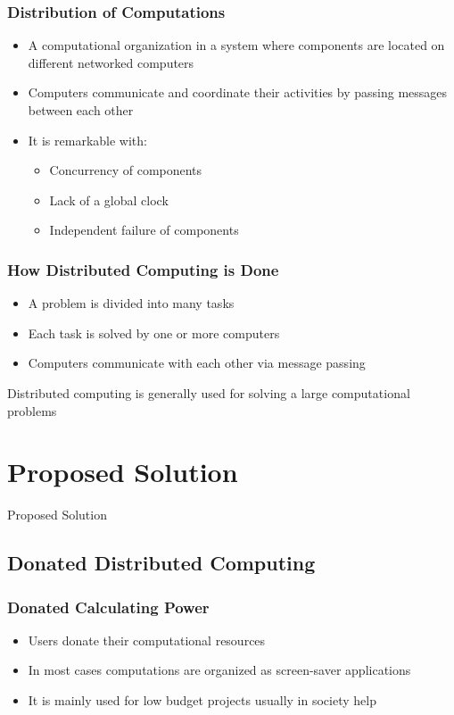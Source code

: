 \documentclass{beamer}
\begin{document}
\begin{frame}
\frametitle{Distribution of Computations}
\begin{itemize}
	\item A computational organization in a system where components are located on different networked computers
	\item Computers communicate and coordinate their activities by passing messages between each other
	\item It is remarkable with:
	\begin{itemize}
		\item Concurrency of components
		\item Lack of a global clock
		\item Independent failure of components
	\end{itemize}
\end{itemize}
\end{frame}

\begin{frame}
\frametitle{How Distributed Computing is Done}
\begin{itemize}
	\item A problem is divided into many tasks
	\item Each task is solved by one or more computers
	\item Computers communicate with each other via message passing
\end{itemize}
{\color{red} Distributed computing is generally used for solving a large computational problems}
\end{frame}

\section{Proposed Solution}

\begin{frame}
\center \huge{Proposed Solution}
\end{frame}

\subsection{Donated Distributed Computing}

\begin{frame}
\frametitle{Donated Calculating Power}
\begin{itemize}
	\item Users donate their computational resources
	\item In most cases computations are organized as screen-saver applications
	\item It is mainly used for low budget projects usually in society help
\end{itemize}
\end{frame}
\end{document}
